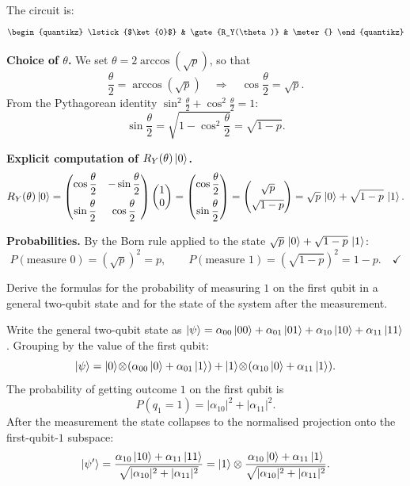 \documentclass{ceri/sty/rapport}
\newcounter{exercice}[section]
\begin{document}
\begin{solution}
The circuit is:
\[
\begin{quantikz}
  \lstick{$\ket{0}$} & \gate{R_Y(\theta)} & \meter{}
\end{quantikz}
\]

\medskip\noindent
\textbf{Choice of $\theta$.}
We set $\theta = 2\arccos\!\left(\sqrt{p}\right)$, so that
\[
  \frac{\theta}{2} = \arccos\!\left(\sqrt{p}\right)
  \quad\Longrightarrow\quad
  \cos\frac{\theta}{2} = \sqrt{p}.
\]
From the Pythagorean identity $\sin^2\!\frac{\theta}{2}+\cos^2\!\frac{\theta}{2}=1$:
\[
  \sin\frac{\theta}{2}
  = \sqrt{1-\cos^2\!\frac{\theta}{2}}
  = \sqrt{1-p}.
\]

\medskip\noindent
\textbf{Explicit computation of $R_Y(\theta)\ket{0}$.}
\[
  R_Y(\theta)\ket{0}
  =\begin{pmatrix}\cos\dfrac{\theta}{2} & -\sin\dfrac{\theta}{2}\\[8pt]
                  \sin\dfrac{\theta}{2} &  \cos\dfrac{\theta}{2}\end{pmatrix}
   \begin{pmatrix}1\\0\end{pmatrix}
  =\begin{pmatrix}\cos\dfrac{\theta}{2}\\[8pt]\sin\dfrac{\theta}{2}\end{pmatrix}
  =\begin{pmatrix}\sqrt{p}\\[4pt]\sqrt{1-p}\end{pmatrix}
  =\sqrt{p}\,\ket{0}+\sqrt{1-p}\,\ket{1}.
\]

\medskip\noindent
\textbf{Probabilities.}
By the Born rule applied to the state $\sqrt{p}\,\ket{0}+\sqrt{1-p}\,\ket{1}$:
\[
  P(\text{measure }0) = \left(\sqrt{p}\right)^2 = p,\qquad
  P(\text{measure }1) = \left(\sqrt{1-p}\right)^2 = 1-p.\quad\checkmark
\]
\end{solution}

\begin{exercice}[p.~26]
Derive the formulas for the probability of measuring $1$ on the first qubit
in a general two-qubit state and for the state of the system after the
measurement.
\end{exercice}

\begin{solution}
Write the general two-qubit state as
$\ket{\psi}=\alpha_{00}\ket{00}+\alpha_{01}\ket{01}+\alpha_{10}\ket{10}+\alpha_{11}\ket{11}$.
Grouping by the value of the first qubit:
\[
  \ket{\psi}=\ket{0}\!\otimes\!(\alpha_{00}\ket{0}+\alpha_{01}\ket{1})
            +\ket{1}\!\otimes\!(\alpha_{10}\ket{0}+\alpha_{11}\ket{1}).
\]
The probability of getting outcome $1$ on the first qubit is
\[
  P(q_1=1) = |\alpha_{10}|^2+|\alpha_{11}|^2.
\]
After the measurement the state collapses to the normalised projection onto the
first-qubit-$1$ subspace:
\[
  \ket{\psi'} = \frac{\alpha_{10}\ket{10}+\alpha_{11}\ket{11}}{\sqrt{|\alpha_{10}|^2+|\alpha_{11}|^2}}
              = \ket{1}\otimes\frac{\alpha_{10}\ket{0}+\alpha_{11}\ket{1}}{\sqrt{|\alpha_{10}|^2+|\alpha_{11}|^2}}.
\]
\end{solution}
\end{document}
